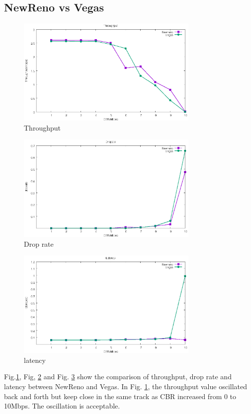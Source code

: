 \documentclass[10pt, conference]{IEEEtran}
\begin{document}
	\subsection{NewReno vs Vegas}
	\begin{figure}[H]
		\centering
		\includegraphics[width=3.45in]{imgs/exp2_tp_Newreno_Vegas.eps}
		\caption[Optional caption]{Throughput}
		\label{fig:17}
	\end{figure}
	\begin{figure}[H]
		\centering
		\includegraphics[width=3.45in]{imgs/exp2_dr_Newreno_Vegas.eps}
		\caption[Optional caption]{Drop rate}
		\label{fig:18}
	\end{figure}
	\begin{figure}[H]
		\centering
		\includegraphics[width=3.45in]{imgs/exp2_la_Newreno_Vegas.eps}
		\caption[Optional caption]{latency}
		\label{fig:19}
	\end{figure}
	Fig.\ref{fig:17}, Fig, \ref{fig:18} and Fig. \ref{fig:19} show the comparison of throughput, drop rate and latency between NewReno and Vegas. In Fig. \ref{fig:17}, the throughput value oscillated back and forth but keep close in the same track as CBR increased from 0 to 10Mbps. The oscillation is acceptable.
	
\end{document}
